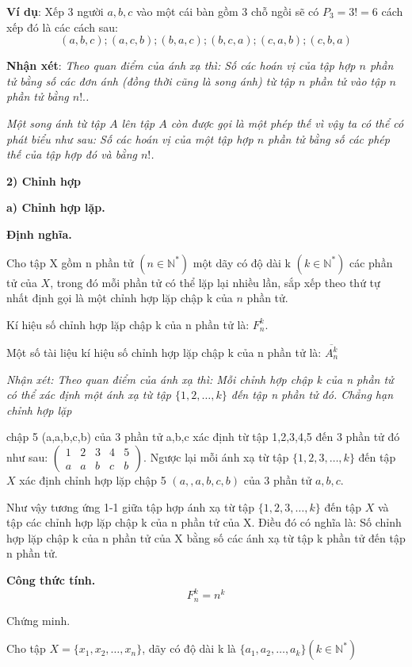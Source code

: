 \documentclass[12pt,oneside,a4paper,reqno]{book}
\begin{document}
{\bf Ví dụ}: Xếp 3 người $a,b,c$ vào một cái bàn gồm 3 chỗ ngồi sẽ có $P_3=3!=6$ cách xếp đó là các cách sau: $$(a,b,c);(a,c,b);(b,a,c);(b,c,a);(c,a,b);(c,b,a)$$

{\bf Nhận xét}:\textit{ Theo quan điểm của ánh xạ thì: Số các hoán vị của tập hợp $n$ phần tử bằng số các đơn ánh (đồng thời cũng là song ánh) từ tập $n$ phần tử vào tập $n$ phần tử bằng $n!.$.}

\textit{Một song ánh từ tập $A$ lên tập $A$ còn được gọi là một phép thế vì vậy ta có thể có phát biểu như sau: Số các hoán vị của một tập hợp $n$ phần tử bằng số các phép thế của tập hợp đó và bằng $n!$.}

\textbf{2) Chỉnh hợp }

\textbf{a) Chỉnh hợp lặp.}

\textbf{Định nghĩa.}

Cho tập X gồm n phần tử $(n\in \mathbb{N}^*)$ một dãy có độ dài k $(k\in \mathbb{N}^*)$ các phần tử của $X$, trong đó mỗi phần tử có thể lặp lại nhiều lần, sắp xếp theo thứ tự nhất định gọi là một chỉnh hợp lặp chập k của $n$ phần tử. 

Kí hiệu số chỉnh hợp lặp chập k của n phần tử là: $F_n^k.$

Một số tài liệu kí hiệu số chỉnh hợp lặp chập k của n phần tử là: $\overline{A_n^k}$

\textit{Nhận xét: Theo quan điểm của ánh xạ thì: Mỗi chỉnh hợp chập k của n phần tử có thể xác định một ánh xạ từ tập $\{1,2,…,k\}$ đến tập n phần tử đó. Chẳng hạn chỉnh hợp lặp }

chập 5 (a,a,b,c,b) của 3 phần tử a,b,c xác định từ tập {1,2,3,4,5} đến 3 phần tử đó như sau: $\begin{pmatrix}
1 &2  &3  &4  &5 \\ 
 a&a  &b  &c  &b 
\end{pmatrix} $. 
Ngược lại mỗi ánh xạ từ tập $\{1,2,3,…,k\}$ đến tập $X$ xác định chỉnh hợp lặp chập 5 $(a,,a,b,c,b)$ của 3 phần tử $a,b,c.$

Như vậy tương ứng 1-1 giữa tập hợp ánh xạ từ tập $\{1,2,3,…,k\}$ đến tập $X$ và tập các chỉnh hợp lặp chập k của n phần tử của X. Điều đó có nghĩa là: Số chỉnh hợp lặp chập k của n phần tử của X bằng số các ánh xạ từ tập k phần tử đến tập n phần tử.


\textbf{Công thức tính.}
                    $$F_n^k=n^k$$
                    
Chứng minh.

Cho tập $X=\{x_1,x_2,…,x_n \}$, dãy có độ dài k là $\{a_1,a_2,…,a_k \}(k\in \mathbb{N}^*)$
\end{document}
